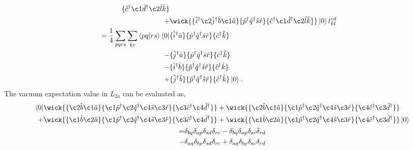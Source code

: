 \begin{align}
\begin{aligned}
{            \{\hat{c}^\dagger \c1{\hat{d}^\dagger} \c2{\hat{l}} \hat{k} \}
            } \\
            +
            &\wick{
            \{\hat{i}^\dagger \c2{\hat{j}}^\dagger \hat{b} \c1{\hat{a}} \}
            \{\hat{p}^\dagger \hat{q}^\dagger \hat{s} \hat{r} \}
            \{\hat{c}^\dagger \c1{\hat{d}^\dagger} \c2{\hat{l}} \hat{k} \}
            }
            \ket{0}t^{cd}_{kl} \\
        = \frac{1}{4} \sum_{pqrs} \sum_{kc} \bra{pq} \ket{rs} \bra{0}
            &\{\hat{i}^\dagger \hat{a}\}
            \{\hat{p}^\dagger \hat{q}^\dagger \hat{s} \hat{r} \}
            \{\hat{c}^\dagger \hat{k} \} 
            \\ -
            &\{\hat{j}^\dagger \hat{a} \}
            \{\hat{p}^\dagger \hat{q}^\dagger \hat{s} \hat{r} \}
            \{\hat{c}^\dagger \hat{k} \} 
            \\ -
            &\{\hat{i}^\dagger \hat{b} \}
            \{\hat{p}^\dagger \hat{q}^\dagger \hat{s} \hat{r} \}
            \{\hat{c}^\dagger \hat{k} \} 
            \\ +
            &\{\hat{j}^\dagger \hat{b} \}
            \{\hat{p}^\dagger \hat{q}^\dagger \hat{s} \hat{r} \}
            \{\hat{c}^\dagger \hat{k} \} 
        \ket{0}.
    \end{aligned}
\end{align}
The vacuum expectation value in $L_{2a}$ can be evaluated as,
\begin{gather}
    \begin{aligned}
        \bra{0}
            &\wick{
            \{ \c2{\hat{b}} \c1{\hat{a}} \}
            \{ \c1{\hat{p}}^\dagger \c2{\hat{q}}^\dagger \c4{\hat{s}} \c3{\hat{r}} \}
            \{ \c3{\hat{c}}^\dagger \c4{\hat{d}}^\dagger \}
            } +
            \wick{
            \{ \c2{\hat{b}} \c1{\hat{a}} \}
            \{ \c1{\hat{p}}^\dagger \c2{\hat{q}}^\dagger \c4{\hat{s}} \c3{\hat{r}} \}
            \{ \c4{\hat{c}}^\dagger \c3{\hat{d}}^\dagger \}
            } \\ +
            &\wick{
            \{ \c1{\hat{b}} \c2{\hat{a}} \}
            \{ \c1{\hat{p}}^\dagger \c2{\hat{q}}^\dagger \c4{\hat{s}} \c3{\hat{r}} \}
            \{ \c3{\hat{c}}^\dagger \c4{\hat{d}}^\dagger \}
            } +
            \wick{
            \{ \c1{\hat{b}} \c2{\hat{a}} \}
            \{ \c1{\hat{p}}^\dagger \c2{\hat{q}}^\dagger \c4{\hat{s}} \c3{\hat{r}} \}
            \{ \c4{\hat{c}}^\dagger \c3{\hat{d}}^\dagger \}
            }
            \ket{0}
    \end{aligned} \\
    \begin{aligned}
         =&\delta_{bq}\delta_{ap}\delta_{sd}\delta_{rc}
          -\delta_{bq}\delta_{ap}\delta_{sc}\delta_{rd} \\
         -&\delta_{aq}\delta_{bp}\delta_{sd}\delta_{rc}
         + \delta_{aq}\delta_{bp}\delta_{sc}\delta_{rd}
    \end{aligned}
\end{gather}
